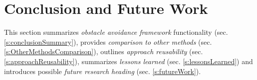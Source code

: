 \cleardoublepage
\chapter{Conclusion and Future Work}\label{ch:Conclusion}
\noindent This section summarizes \emph{obstacle avoidance framework} functionality (sec. \ref{s:conclusionSummary}), provides \emph{comparison to other methods} (sec. \ref{s:OtherMethodsComparison}), outlines \emph{approach reusability} (sec. \ref{s:approachReusability}), summarizes \emph{lessons learned} (sec. \ref{s:lessonsLearned}) and introduces possible \emph{future research heading} (sec. \ref{s:futureWork}).


